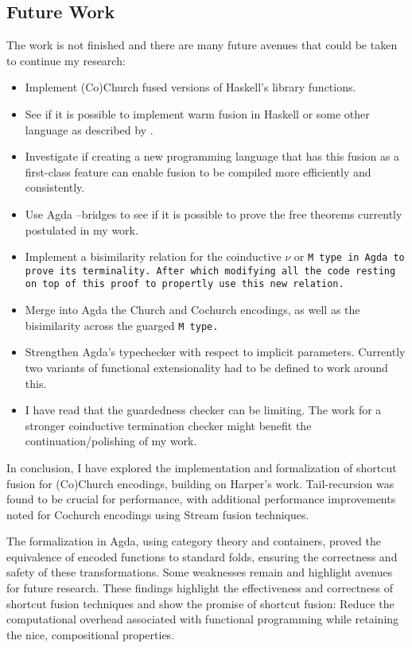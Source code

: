 \subsection*{Future Work}
The work is not finished and there are many future avenues that could be taken to continue my research:
\begin{itemize}[noitemsep]
    \item Implement (Co)Church fused versions of Haskell's library functions.
    \item See if it is possible to implement warm fusion in Haskell or some other language as described by \cite{Launchbury1995}.
    \item Investigate if creating a new programming language that has this fusion as a first-class feature can enable fusion to be compiled more efficiently and consistently.
    \item Use Agda --bridges to see if it is possible to prove the free theorems currently postulated in my work.
    \item Implement a bisimilarity relation for the coinductive $\nu$ or \tt{M} type in Agda to prove its terminality. After which modifying all the code resting on top of this proof to propertly use this new relation.
    \item Merge into Agda the Church and Cochurch encodings, as well as the bisimilarity across the guarged \tt{M} type.
    \item Strengthen Agda's typechecker with respect to implicit parameters. Currently two variants of functional extensionality had to be defined to work around this.
    \item I have read that the guardedness checker can be limiting. The work for a stronger coinductive termination checker might benefit the continuation/polishing of my work.
\end{itemize}
In conclusion, I have explored the implementation and formalization of shortcut fusion for (Co)Church encodings, building on Harper's work.
Tail-recursion was found to be crucial for performance, with additional performance improvements noted for Cochurch encodings using Stream fusion techniques.

The formalization in Agda, using category theory and containers, proved the equivalence of encoded functions to standard folds, ensuring the correctness and safety of these transformations.
Some weaknesses remain and highlight avenues for future research.
These findings highlight the effectiveness and correctness of shortcut fusion techniques and show the promise of shortcut fusion: Reduce the computational overhead associated with functional programming while retaining the nice, compositional properties.
